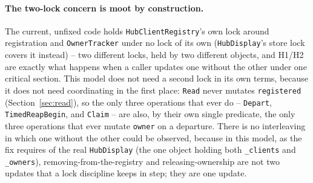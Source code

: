 \documentclass[a4paper,10pt,fleqn]{article}
\begin{document}
\paragraph{The two-lock concern is moot by construction.}
The current, unfixed code holds \texttt{HubClientRegistry}'s own lock
around registration and \texttt{OwnerTracker} under no lock of its own
(\texttt{HubDisplay}'s store lock covers it instead) -- two different
locks, held by two different objects, and H1/H2 are exactly what happens
when a caller updates one without the other under one critical section.
This model does not need a second lock in its own terms, because it does
not need coordinating in the first place: \texttt{Read} never mutates
\texttt{registered} (Section~\ref{sec:read}), so the only three
operations that ever do -- \texttt{Depart}, \texttt{TimedReapBegin}, and
\texttt{Claim} -- are also, by their own single predicate, the only
three operations that ever mutate \texttt{owner} on a departure. There
is no interleaving in which one without the other could be observed,
because in this model, as the fix requires of the real
\texttt{HubDisplay} (the one object holding both \texttt{\_clients} and
\texttt{\_owners}), removing-from-the-registry and releasing-ownership
are not two updates that a lock discipline keeps in step; they are one
update.
\end{document}
